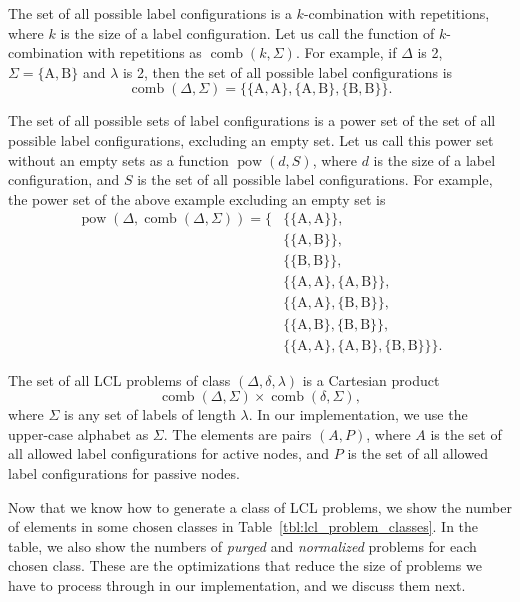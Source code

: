 The set of all possible label configurations is a $k$-combination with repetitions, where $k$ is the size of a label configuration.
Let us call the function of $k$-combination with repetitions as $\operatorname{comb}(k, \Sigma)$.
For example, if $\Delta$ is 2, $\Sigma=\{\mathrm{A, B}\}$ and $\lambda$ is 2, then the set of all possible label configurations is
$$ \operatorname{comb}(\Delta, \Sigma) = \{ \{\mathrm{A, A}\}, \{\mathrm{A, B}\}, \{\mathrm{B, B}\} \}. $$

The set of all possible sets of label configurations is a power set of the set of all possible label configurations, excluding an empty set.
Let us call this power set without an empty sets as a function $\operatorname{pow}(d, S)$, where $d$ is the size of a label configuration, and $S$ is the set of all possible label configurations.
For example, the power set of the above example excluding an empty set is
\begin{align*}
  \operatorname{pow}(\Delta, \operatorname{comb}(\Delta, \Sigma)) =  \{&\{\{\mathrm{A, A}\}\}, \\
    &\{\{\mathrm{A, B}\}\}, \\
    &\{\{\mathrm{B, B}\}\}, \\
    &\{\{\mathrm{A, A}\}, \{\mathrm{A, B}\}\}, \\
    &\{\{\mathrm{A, A}\}, \{\mathrm{B, B}\}\}, \\
    &\{\{\mathrm{A, B}\}, \{\mathrm{B, B}\}\}, \\
    &\{\{\mathrm{A, A}\}, \{\mathrm{A, B}\}, \{\mathrm{B, B}\}\} \}.
\end{align*}

The set of all LCL problems of class $(\Delta, \delta, \lambda)$ is a Cartesian product
$$ \operatorname{comb}(\Delta, \Sigma) \times \operatorname{comb}(\delta, \Sigma),$$
where $\Sigma$ is any set of labels of length $\lambda$.
In our implementation, we use the upper-case alphabet as $\Sigma$.
The elements are pairs $(A, P)$, where $A$ is the set of all allowed label configurations for active nodes, and $P$ is the set of all allowed label configurations for passive nodes.

Now that we know how to generate a class of LCL problems, we show the number of elements in some chosen classes in Table~\ref{tbl:lcl_problem_classes}.
In the table, we also show the numbers of \emph{purged} and \emph{normalized} problems for each chosen class.
These are the optimizations that reduce the size of problems we have to process through in our implementation, and we discuss them next.

